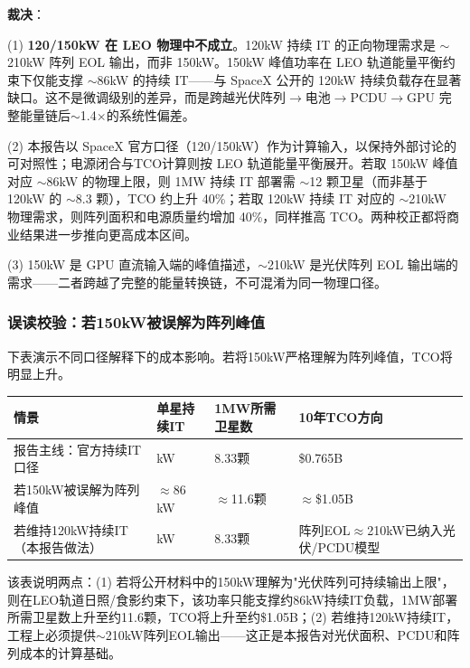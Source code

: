 \medskip

\textbf{裁决}：

(1) \textbf{120/150\;kW 在 LEO 物理中不成立}。120\;kW 持续 IT 的正向物理需求是 $\sim$210\;kW 阵列 EOL 输出，而非 150\;kW。150\;kW 峰值功率在 LEO 轨道能量平衡约束下仅能支撑 $\sim$86\;kW 的持续 IT——与 SpaceX 公开的 120\;kW 持续负载存在显著缺口。这不是微调级别的差异，而是跨越光伏阵列$\to$电池$\to$PCDU$\to$GPU 完整能量链后$\sim$1.4$\times$的系统性偏差。

(2) 本报告以 SpaceX 官方口径（120/150\;kW）作为计算输入，以保持外部讨论的可对照性；电源闭合与TCO计算则按 LEO 轨道能量平衡展开。若取 150\;kW 峰值对应 $\sim$86\;kW 的物理上限，则 1\;MW 持续 IT 部署需 $\sim$12 颗卫星（而非基于 120\;kW 的 $\sim$8.3 颗），TCO 约上升 40\%；若取 120\;kW 持续 IT 对应的 $\sim$210\;kW 物理需求，则阵列面积和电源质量约增加 40\%，同样推高 TCO。两种校正都将商业结果进一步推向更高成本区间。

(3) 150\;kW 是 GPU 直流输入端的峰值描述，$\sim$210\;kW 是光伏阵列 EOL 输出端的需求——二者跨越了完整的能量转换链，不可混淆为同一物理口径。

\subsubsection{误读校验：若150kW被误解为阵列峰值}

下表演示不同口径解释下的成本影响。若将150kW严格理解为阵列峰值，TCO将明显上升。

\medskip
\noindent
\begin{tabular}{p{3.8cm}>{\centering\arraybackslash}p{2.3cm}>{\centering\arraybackslash}p{2.3cm}>{\centering\arraybackslash}p{3.5cm}}
\toprule
\textbf{情景} & \textbf{单星持续IT} & \textbf{1MW所需卫星数} & \textbf{10年TCO方向} \\
\midrule
报告主线：官方持续IT口径 & 120 kW & 8.33颗 & \$0.765B \\
若150kW被误解为阵列峰值 & $\approx$86 kW & $\approx$11.6颗 & $\approx$\$1.05B \\
若维持120kW持续IT（本报告做法） & 120 kW & 8.33颗 & 阵列EOL$\approx$210kW已纳入光伏/PCDU模型 \\
\bottomrule
\end{tabular}
\medskip

该表说明两点：(1) 若将公开材料中的150\;kW理解为"光伏阵列可持续输出上限"，则在LEO轨道日照/食影约束下，该功率只能支撑约86\;kW持续IT负载，1\;MW部署所需卫星数上升至约11.6颗，TCO将上升至约\$1.05B；(2) 若维持120\;kW持续IT，工程上必须提供$\sim$210\;kW阵列EOL输出——这正是本报告对光伏面积、PCDU和阵列成本的计算基础。

